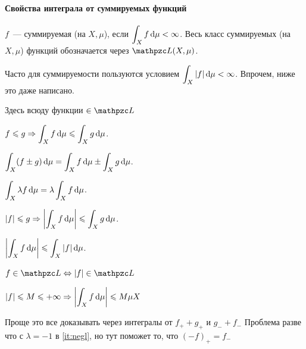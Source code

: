 \documentclass[draft, timbord]{longnotes}
\begin{document}
\paragraph{Свойства интеграла от суммируемых функций}
\label{par:meas::summprop}

\begin{defn}\label{defn:meas::summprop::summ}
  $f$~--- суммируемая (на $X,\mu$), если $\displaystyle\int _X f \, \mathrm{d} \mu < \infty$.
  Весь класс суммируемых (на $X,\mu$) функций обозначается через $\summb (X,\mu)$.
\end{defn}
\begin{rem*}
  Часто для суммируемости пользуются условием $\displaystyle\int_X |f|\, \mathrm{d} \mu < \infty $.
  Впрочем, ниже это даже написано.
\end{rem*}

Здесь всюду функции $\in \summb$
\begin{enumerate}
  \item $\displaystyle
    f \leqslant g \Rightarrow \int_X f \, \mathrm{d} \mu \leqslant \int_X g \, \mathrm{d} \mu$.
  
  \item $\displaystyle
    \int_X (f \pm g)\, \mathrm{d} \mu =  \int_X f \, \mathrm{d} \mu \pm \int_X g \, \mathrm{d} \mu$.

  \item\label{it:negl} $\displaystyle
    \int_X \lambda f \, \mathrm{d} \mu =  \lambda \int_X f \, \mathrm{d} \mu$.
  
  \item $\displaystyle
    |f| \leqslant g  \Rightarrow \left| \int_X f \, \mathrm{d}\mu \right|\leqslant \int_X g \, \mathrm{d} \mu$.

  \item $\displaystyle
    \left| \int_X f \, \mathrm{d} \mu \right| \leqslant \int_X |f| \, \mathrm{d} \mu$.
  
  \item $\displaystyle
    f \in \summb \Leftrightarrow |f| \in \summb$

  \item $\displaystyle
    |f| \leqslant M \leqslant +\infty 
    \Rightarrow \left| \int_X f \, \mathrm{d}\mu \right| \leqslant M \mu X$
\end{enumerate}
Проще это все доказывать через интегралы от $f_{+} + g_{+}$ и $g_- + f_-$
Проблема разве что с $\lambda = -1$ в \ref{it:negl}, но тут поможет то, что $(-f)_+ = f_-$
\end{document}
